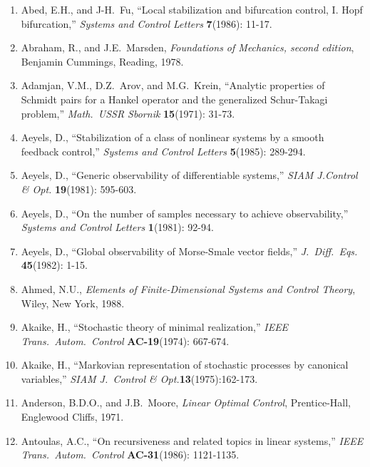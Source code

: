 \begin{enumerate}

\item
Abed, E.H., and J-H.\ Fu, ``Local stabilization and bifurcation control, I.
Hopf bifurcation,'' {\it Systems and Control Letters} {\bf 7}(1986): 11-17.

\item
Abraham, R., and J.E.\ Marsden, {\it Foundations of Mechanics, second
edition}, Benjamin Cummings, Reading, 1978.

\item
Adamjan, V.M., D.Z.\ Arov, and M.G.\ Krein, ``Analytic properties of Schmidt
pairs for a Hankel operator and the generalized Schur-Takagi problem,'' {\it
Math.\ USSR Sbornik} {\bf 15}(1971): 31-73.

\item
Aeyels, D., ``Stabilization of a class of nonlinear systems by a smooth
feedback control,'' {\it Systems and Control Letters} {\bf 5}(1985): 289-294.

\item
Aeyels, D., ``Generic observability of differentiable systems,'' {\it SIAM
J.Control \& Opt.} {\bf 19}(1981): 595-603.

\item
Aeyels, D., ``On the number of samples necessary to achieve observability,''
{\it Systems and Control Letters} {\bf 1}(1981): 92-94.

\item
Aeyels, D., ``Global observability of Morse-Smale vector fields,'' {\it J.\
Diff.\ Eqs.} {\bf 45}(1982): 1-15.

\item
Ahmed, N.U., {\it Elements of Finite-Dimensional Systems and Control Theory},
Wiley, New York, 1988.

\item
Akaike, H., ``Stochastic theory of minimal realization,'' {\it IEEE Trans.\
Autom.\ Control} {\bf AC-19}(1974): 667-674.

\item
Akaike, H., ``Markovian representation of stochastic processes by canonical
variables,'' {\it SIAM J.\ Control \& Opt.}{\bf 13}(1975):162-173.

\item
Anderson, B.D.O., and J.B.\ Moore, {\it Linear Optimal Control},
Prentice-Hall, Englewood Cliffs, 1971.

\item
Antoulas, A.C., ``On recursiveness and related topics in linear systems,''
{\it IEEE Trans.\ Autom.\ Control} {\bf AC-31}(1986): 1121-1135.


\end{enumerate}

